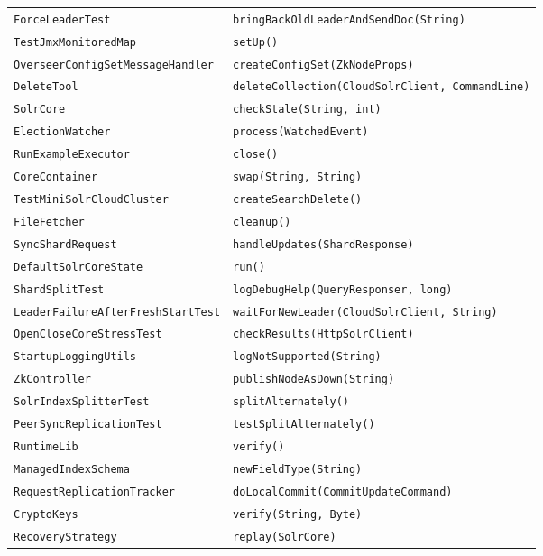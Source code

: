 \begin{center}
\begin{longtable}{ll}
\lstinline/ForceLeaderTest/&{\lstinline/bringBackOldLeaderAndSendDoc(String)/}\\
\lstinline/TestJmxMonitoredMap/&{\lstinline/setUp()/}\\
\lstinline/OverseerConfigSetMessageHandler/&{\lstinline/createConfigSet(ZkNodeProps)/}\\
\lstinline/DeleteTool/&{\lstinline/deleteCollection(CloudSolrClient, CommandLine)/}\\
\lstinline/SolrCore/&{\lstinline/checkStale(String, int)/}\\
\lstinline/ElectionWatcher/&{\lstinline/process(WatchedEvent)/}\\
\lstinline/RunExampleExecutor/&{\lstinline/close()/}\\
\lstinline/CoreContainer/&{\lstinline/swap(String, String)/}\\
\lstinline/TestMiniSolrCloudCluster/&{\lstinline/createSearchDelete()/}\\
\lstinline/FileFetcher/&{\lstinline/cleanup()/}\\
\lstinline/SyncShardRequest/&{\lstinline/handleUpdates(ShardResponse)/}\\
\lstinline/DefaultSolrCoreState/&{\lstinline/run()/}\\
\lstinline/ShardSplitTest/&{\lstinline/logDebugHelp(QueryResponser, long)/}\\
\lstinline/LeaderFailureAfterFreshStartTest/&{\lstinline/waitForNewLeader(CloudSolrClient, String)/}\\
\lstinline/OpenCloseCoreStressTest/&{\lstinline/checkResults(HttpSolrClient)/}\\
\lstinline/StartupLoggingUtils/&{\lstinline/logNotSupported(String)/}\\
\lstinline/ZkController/&{\lstinline/publishNodeAsDown(String)/}\\
\lstinline/SolrIndexSplitterTest/&{\lstinline/splitAlternately()/}\\
\lstinline/PeerSyncReplicationTest/&{\lstinline/testSplitAlternately()/}\\
\lstinline/RuntimeLib/&{\lstinline/verify()/}\\
\lstinline/ManagedIndexSchema/&{\lstinline/newFieldType(String)/}\\
\lstinline/RequestReplicationTracker/&{\lstinline/doLocalCommit(CommitUpdateCommand)/}\\
\lstinline/CryptoKeys/&{\lstinline/verify(String, Byte)/}\\
\lstinline/RecoveryStrategy/&{\lstinline/replay(SolrCore)/}\\

\end{longtable}
\end{center}
